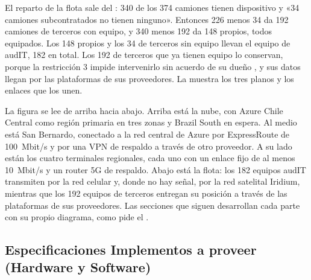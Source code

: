 El reparto de la flota sale del : 340 de los 374 camiones tienen dispositivo y
«34 camiones subcontratados no tienen ninguno». Entonces 226 menos 34 da 192 camiones de terceros con
equipo, y 340 menos 192 da 148 propios, todos equipados. Los 148 propios y los 34 de terceros sin
equipo llevan el equipo de audIT, 182 en total. Los 192 de terceros que ya tienen equipo lo conservan,
porque la restricción 3 impide intervenirlo sin acuerdo de su dueño , y sus
datos llegan por las plataformas de sus proveedores. La  muestra los tres planos y
los enlaces que los unen.


La figura se lee de arriba hacia abajo. Arriba está la nube, con Azure Chile Central como región
primaria en tres zonas y Brazil South en espera. Al medio está San Bernardo, conectado a la red central
de Azure por ExpressRoute de 100~Mbit/s y por una VPN de respaldo a través de otro proveedor. A su
lado están los cuatro terminales regionales, cada uno con un enlace fijo de al menos 10~Mbit/s y un
router 5G de respaldo. Abajo está la flota: los 182 equipos audIT transmiten por la red celular y,
donde no hay señal, por la red satelital Iridium, mientras que los 192 equipos de terceros entregan su
posición a través de las plataformas de sus proveedores. Las secciones que siguen desarrollan cada
parte con su propio diagrama, como pide el .

\subsection{Especificaciones Implementos a proveer (Hardware y Software)}\label{sec:4-implementos}

